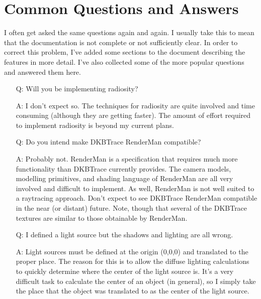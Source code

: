 \chapter{Common Questions and Answers}

I often get asked the same questions again and again.  I usually take this to
mean that the documentation is not complete or not sufficiently clear.  In
order to correct this problem, I've added some sections to the document
describing the features in more detail.  I've also collected some of the more
popular questions and answered them here.

\begin{itemize}
\item[Q:] Will you be implementing radiosity?
\item[A:] I don't expect so.  The techniques for radiosity are quite involved
and time consuming (although they are getting faster).  The amount of
effort required to implement radiosity is beyond my current plans.

\item[Q:] Do you intend make DKBTrace RenderMan compatible?
\item[A:] Probably not.  RenderMan is a specification that requires much more
functionality than DKBTrace currently provides.  The camera models,
modelling primitives, and shading language of RenderMan are all very
involved and difficult to implement.  As well, RenderMan is not well
suited to a raytracing approach.  Don't expect to see DKBTrace
RenderMan compatible in the near (or distant) future.  Note, though
that several of the DKBTrace textures are similar to those obtainable
by RenderMan.

\item[Q:] I defined a light
source but the shadows and lighting are all wrong.
\item[A:] Light sources must be defined at the origin (0,0,0) and translated to
the proper place.  The reason for this is to allow the diffuse lighting
calculations to quickly determine where the center of the light source
is.  It's a very difficult task to calculate the center of an object
(in general), so I simply take the place that the object was translated
to as the center of the light source.


\end{itemize}
